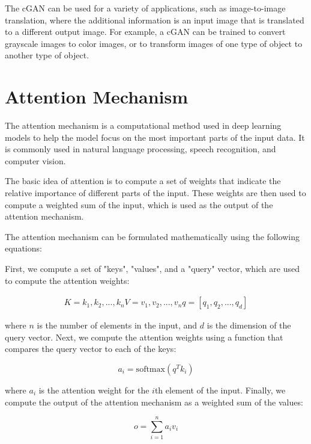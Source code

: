 The cGAN can be used for a variety of applications, such as image-to-image translation, where the additional information is an input image that is translated to a different output image. For example, a cGAN can be trained to convert grayscale images to color images, or to transform images of one type of object to another type of object.

\section{Attention Mechanism}
\label{sec:3_attention}

The attention mechanism is a computational method used in deep learning models to help the model focus on the most important parts of the input data. It is commonly used in natural language processing, speech recognition, and computer vision.

The basic idea of attention is to compute a set of weights that indicate the relative importance of different parts of the input. These weights are then used to compute a weighted sum of the input, which is used as the output of the attention mechanism.

The attention mechanism can be formulated mathematically using the following equations:

First, we compute a set of "keys", "values", and a "query" vector, which are used to compute the attention weights:

\begin{equation}
\begin{split}
	K = {k_1, k_2, ..., k_n}
	V = {v_1, v_2, ..., v_n}
	q = [q_1, q_2, ..., q_d]
\end{split}
\end{equation}

where $n$ is the number of elements in the input, and $d$ is the dimension of the query vector. Next, we compute the attention weights using a function that compares the query vector to each of the keys:

\begin{equation}
	a_i = \text{softmax}(q^T k_i)
\end{equation}

where $a_i$ is the attention weight for the $i$th element of the input. Finally, we compute the output of the attention mechanism as a weighted sum of the values:

\begin{equation}
	o = \sum_{i=1}^{n} a_i v_i
\end{equation}

